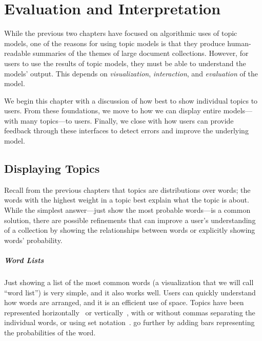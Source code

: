 \chapter{Evaluation and Interpretation}
\label{ch:viz}

While the previous two chapters have focused on algorithmic uses of topic
models, one of the reasons for using topic models is that they produce
human-readable summaries of the themes of large document collections.  However,
for users to use the results of topic models, they must be able to understand
the models' output.  This depends on \emph{visualization},
\emph{interaction}, and \emph{evaluation} of the model.

We begin this chapter with a discussion of how best to show individual
topics to users.  From these foundations, we move to how we can
display entire models---with many topics---to users.  Finally, we
close with how users can provide feedback through these interfaces to
detect errors and improve the underlying model.

\section{Displaying Topics}
\label{sec:display}

Recall from the previous chapters that topics are distributions over words; the
words with the highest weight in a topic best explain what the topic is about.
While the simplest answer---just show the most probable words---is a common
solution, there are possible refinements that can improve a user's understanding
of a collection by showing the relationships between words or explicitly showing
words' probability.

\paragraph{Word Lists}

Just showing a list of the most common words (a
visualization that we will call ``word list'') is very simple, and it also works well.
Users can quickly understand how words are arranged, and it is an efficient use of
space. 
Topics have been represented horizontally~\citep{gardner2010topic,smith2015visual} or
vertically~\citep{eisenstein2012topicviz,chaney2012visualizing}, with or without
commas separating the individual words, or using set
notation~\citep{chaney2012visualizing}.  \citet{smith2015visual} go further by
adding bars representing the probabilities of the word.

